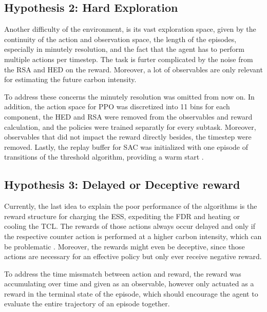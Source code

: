 \subsection{Hypothesis 2: Hard Exploration}
Another difficulty of the environment, is its vast exploration space, given by the continuity of the action and observation space, the length of the episodes, especially in minutely resolution, and the fact that the agent has to perform multiple actions per timestep. The task is furter complicated by the noise from the RSA and HED on the reward. Moreover, a lot of observables are only relevant for estimating the future carbon intensity. 
\par
To address these concerns the minutely resolution was omitted from now on. In addition, the action space for PPO was discretized into 11 bins for each component, the HED and RSA were removed from the observables and reward calculation, and the policies were trained separatly for every subtask. Moreover, observables that did not impact the reward directly besides, the timestep were removed. Lastly, the replay buffer for SAC was initialized with one episode of transitions of the threshold algorithm, providing a warm start \cite{Wang.20.06.2023}.
\subsection{Hypothesis 3: Delayed or Deceptive reward}
Currently, the last idea to explain the poor performance of the algorithms is the reward structure for charging the ESS, expediting the FDR and heating or cooling the TCL. The rewards of those actions always occur delayed and only if the respective counter action is performed at a higher carbon intensity, which can be problematic \cite{Sutton.1984}. Moreover, the rewards might even be deceptive, since those actions are necessary for an effective policy but only ever receive negative reward.
\par
To address the time missmatch between action and reward, the reward was accumulating over time and given as an observable, however only actuated as a reward in the terminal state of the episode, which should encourage the agent to evaluate the entire trajectory of an episode together.
